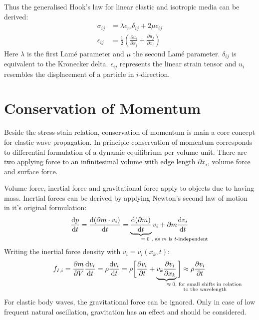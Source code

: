 \documentclass[pdftex,a4paper,parskip,listof=totoc,bibliography=totoc,onehalfspacing,12pt]{scrreprt}
\begin{document}
Thus the generalised Hook's law for linear elastic and isotropic media can be derived:
\begin{align}
	\sigma_{ij} &= \lambda \epsilon_{rr} \delta_{ij} + 2 \mu \epsilon_{ij}\label{eqn:GenHook}\\
	\epsilon_{ij} &= \frac{1}{2} \left( \frac{\partial u_i}{\partial x_j} + \frac{\partial u_j}{\partial x_i} \right)\label{eqn:Dehnij}
\end{align}
Here $\lambda$ is the first Lam\'{e} parameter and $\mu$ the second Lam\'{e} parameter. $\delta_{ij}$ is equivalent to the Kronecker delta. $\epsilon_{ij}$ represents the linear strain tensor and $u_i$ resembles the displacement of a particle in $i$-direction.

\section{Conservation of Momentum}

Beside the stress-stain relation, conservation of momentum is main a core concept for elastic wave propagation. In principle conservation of momentum corresponds to differential formulation of a dynamic equilibrium per volume unit. There are two applying force to an infinitesimal volume with edge length $\partial x_i$, volume force and surface force. \citep{landau:97}

Volume force, inertial force and gravitational force apply to objects due to having mass. 
Inertial forces can be derived by applying Newton's  second law of motion in it's original formulation: 
\begin{equation}
	\frac{\mathrm{d} p}{\mathrm{d} t} = \frac{\mathrm{d} (\partial m \cdot v_i)}{\mathrm{d} t} = \underbrace{\frac{\mathrm{d} (\partial m)}{\mathrm{d} t}}_{\mathrlap{\text{$= 0$ , as $m$ is $t$-independent}}} v_i + \partial m \frac{\mathrm{d} v_i}{\mathrm{d} t}
\end{equation}
Writing the inertial force density with $v_i = v_i (x_k,t)$:
\begin{equation}
	f_{I,i} = \frac{\partial m}{\partial V} \frac{\mathrm{d} v_i}{\mathrm{d} t} = \rho \frac{\mathrm{d} v_i}{\mathrm{d} t} = \rho \bigg[ \frac{\partial v_i}{\partial t} + \underbrace{v_k \frac{\partial v_i}{\partial x_k}}_{\mathrlap{\substack{\text{$\approx 0$, for small shifts in relation}\\\text{ to the wavelength}}}} \bigg] \approx \rho \frac{\partial v_i}{\partial t}\label{eqn:TKD}
\end{equation}
For elastic body waves, the gravitational force can be ignored. Only in case of low frequent natural oscillation, gravitation has an effect and should be considered.
\end{document}
